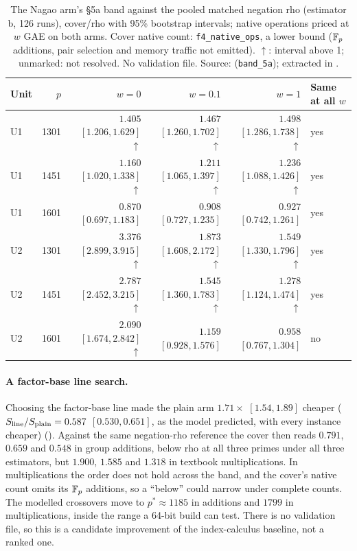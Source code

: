 \begin{table}[t]
\centering\small
\setlength{\tabcolsep}{4pt}
\begin{tabular}{@{}lrrrrl@{}}
\toprule
Unit & $p$ & $w=0$ & $w=0.1$ & $w=1$ & Same at all $w$ \\
\midrule
U1 & 1301 & $1.405$ $[1.206,1.629]$$\uparrow$ & $1.467$ $[1.260,1.702]$$\uparrow$ & $1.498$ $[1.286,1.738]$$\uparrow$ & yes \\
U1 & 1451 & $1.160$ $[1.020,1.338]$$\uparrow$ & $1.211$ $[1.065,1.397]$$\uparrow$ & $1.236$ $[1.088,1.426]$$\uparrow$ & yes \\
U1 & 1601 & $0.870$ $[0.697,1.183]$ & $0.908$ $[0.727,1.235]$ & $0.927$ $[0.742,1.261]$ & yes \\
U2 & 1301 & $3.376$ $[2.899,3.915]$$\uparrow$ & $1.873$ $[1.608,2.172]$$\uparrow$ & $1.549$ $[1.330,1.796]$$\uparrow$ & yes \\
U2 & 1451 & $2.787$ $[2.452,3.215]$$\uparrow$ & $1.545$ $[1.360,1.783]$$\uparrow$ & $1.278$ $[1.124,1.474]$$\uparrow$ & yes \\
U2 & 1601 & $2.090$ $[1.674,2.842]$$\uparrow$ & $1.159$ $[0.928,1.576]$ & $0.958$ $[0.767,1.304]$ & no \\
\bottomrule
\end{tabular}
\caption[]{The Nagao arm's \S5a band against the pooled matched negation
rho (estimator b, 126 runs), cover/rho with 95\% bootstrap intervals;
native operations priced at $w$ GAE on both arms. Cover native count:
\texttt{f4\_native\_ops}, a lower bound ($\mathbb{F}_p$ additions, pair
selection and memory traffic not emitted). $\uparrow$: interval above 1;
unmarked: not resolved. No validation file. Source:
(\texttt{band\_5a}); extracted in .}
\label{tab:pf-jv-band}
\end{table}

\paragraph{A factor-base line search.} Choosing the factor-base line made
the plain arm $1.71\times$ $[1.54,1.89]$ cheaper ($S_{\rm line}/S_{\rm plain}=0.587$
$[0.530,0.651]$, as the model predicted, with every instance cheaper)
(). Against the same
negation-rho reference the cover then reads $0.791$, $0.659$ and $0.548$ in
group additions, below rho at all three primes under all three estimators,
but $1.900$, $1.585$ and $1.318$ in textbook multiplications. In
multiplications the order does not hold across the band, and the cover's
native count omits its $\mathbb{F}_p$ additions, so a ``below'' could narrow under
complete counts. The modelled crossovers move to $p^*\approx1185$ in
additions and $1799$ in multiplications, inside the range a 64-bit build can
test. There is no validation file, so this is a candidate improvement of
the index-calculus baseline, not a ranked one.

